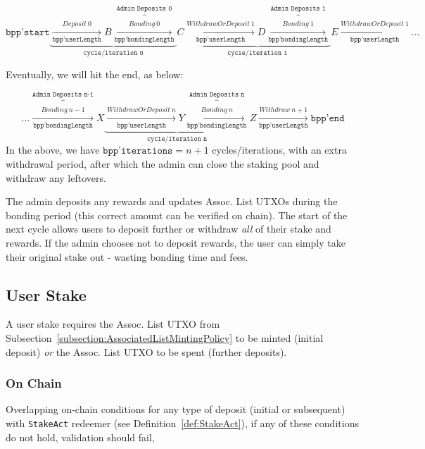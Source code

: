 \documentclass[10pt, a4paper]{article}
\theoremstyle{definition}
\begin{document}
\begin{equation}\label{eqn:startCycles}
\texttt{bpp'start} \underbrace{ \xrightarrow[\texttt{bpp'userLength}] {Deposit\ 0} B 
  \overbrace{\xrightarrow[\texttt{bpp'bondingLength}] {Bonding \ 0}}^\texttt{Admin Deposits 0}}_\texttt{cycle/iteration 0} C
  \underbrace{\xrightarrow[\texttt{bpp'userLength}]{WithdrawOrDeposit \ 1}D
  \overbrace{\xrightarrow[\texttt{bpp'bondingLength}] {Bonding \ 1}}^\texttt{Admin Deposits 1}}_\texttt{cycle/iteration 1} E \xrightarrow[\texttt{bpp'userLength}]{WithdrawOrDeposit \ 1} \ldots
\end{equation}

Eventually, we will hit the end, as below:

\begin{equation}\label{eqn:endCycles}
 \ldots \overbrace{\xrightarrow[\texttt{bpp'bondingLength}] {Bonding \ n-1}}^\texttt{Admin Deposits n-1} X
  \underbrace{\xrightarrow[\texttt{bpp'userLength}]{WithdrawOrDeposit \ n}   Y
  \overbrace{\xrightarrow[\texttt{bpp'bondingLength}] {Bonding \ n}}^\texttt{Admin Deposits n} }_\texttt{cycle/iteration n} Z \xrightarrow[\texttt{bpp'userLength}]{Withdraw \ n+1}\texttt{bpp'end}
\end{equation}
In the above, we have $\texttt{bpp'iterations}=n+1$ cycles/iterations, with an extra withdrawal period, after which the admin can close the staking pool and withdraw any leftovers.

The admin deposits any rewards and updates Assoc. List UTXOs during the bonding period (this correct amount can be verified on chain). The start of the next cycle allows users to deposit further or withdraw \textit{all} of their stake and rewards. If the admin chooses not to deposit rewards, the user can simply take their original stake out - wasting bonding time and fees.

\label{section:bondedSchema}
\subsection{User Stake}\label{subsection:userStake}
A user stake requires the Assoc. List UTXO from Subsection~\ref{subsection:AssociatedListMintingPolicy} to be minted (initial deposit) \textit{or} the Assoc. List UTXO to be spent (further deposits).

\subsubsection{On Chain}\label{subsubsection:userStakeOnchain}
Overlapping on-chain conditions for any type of deposit (initial or subsequent) with \texttt{StakeAct} redeemer (see Definition~\ref{def:StakeAct}), if any of these conditions do not hold, validation should fail,
\end{document}
